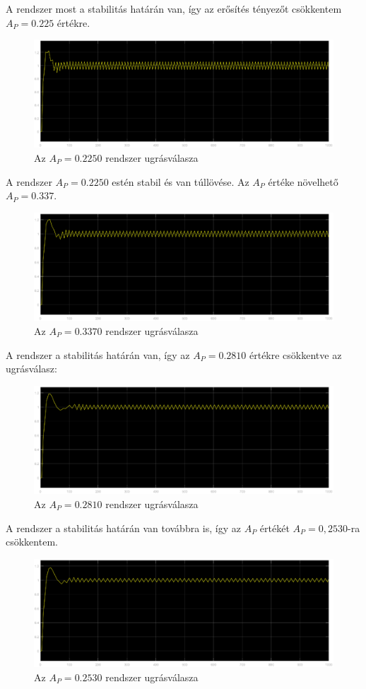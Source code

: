 \documentclass[12pt]{article}
\begin{document}
A rendszer most a stabilitás határán van, így az erősítés tényezőt csökkentem $A_P=0.225$ értékre.
\begin{figure}[H]
\centering
\includegraphics[scale=.50]{ap0450}
\caption{Az $A_P=0.2250$ rendszer ugrásválasza}
\end{figure}
A rendszer $A_P=0.2250$ estén stabil és van túllövése. Az $A_P$ értéke növelhető $A_P=0.337$.
\begin{figure}[H]
\centering
\includegraphics[scale=.50]{ap337}
\caption{Az $A_P=0.3370$ rendszer ugrásválasza}
\end{figure}
A rendszer a stabilitás határán van, így az $A_P=0.2810$ értékre csökkentve az ugrásválasz:
\begin{figure}[H]
\centering
\includegraphics[scale=.50]{ap02810}
\caption{Az $A_P=0.2810$ rendszer ugrásválasza}
\end{figure}
A rendszer a stabilitás határán van továbbra is, így az $A_P$ értékét $A_P=0,2530$-ra csökkentem.
\begin{figure}[H]
\centering
\includegraphics[scale=.50]{ap0253}
\caption{Az $A_P=0.2530$ rendszer ugrásválasza}
\end{figure}
\end{document}
